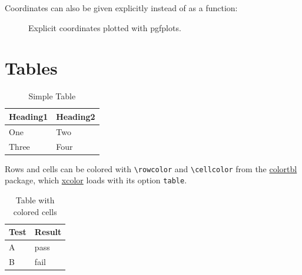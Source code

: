 Coordinates can also be given explicitly instead of as a function:
\begin{ltgexample}
\begin{figure}[ht]
  \centering
  \caption{Explicit coordinates plotted with pgfplots.}
  \label{fig:pgfplots_coords}
\end{figure}
\end{ltgexample}

\section{Tables}

\begin{ltgexample}
\begin{table}
  \caption{Simple Table}
  \label{tab:simple}
  \centering
  \begin{tabular}{ll}
    \toprule
    Heading1 & Heading2 \\
    \midrule
    One      & Two      \\
    Three    & Four     \\
    \bottomrule
  \end{tabular}
\end{table}
\end{ltgexample}

Rows and cells can be colored with \verb|\rowcolor| and \verb|\cellcolor| from the \href{https://ctan.org/pkg/colortbl}{colortbl} package, which \href{https://ctan.org/pkg/xcolor}{xcolor} loads with its option \verb|table|.

\begin{ltgexample}
\begin{table}
  \caption{Table with colored cells}
  \label{tab:colored}
  \centering
  \begin{tabular}{ll}
    \toprule
    \rowcolor{gray!20}
    Test & Result                   \\
    \midrule
    A    & \cellcolor{green!20}pass \\
    B    & \cellcolor{red!20}fail   \\
    \bottomrule
  \end{tabular}
\end{table}
\end{ltgexample}

